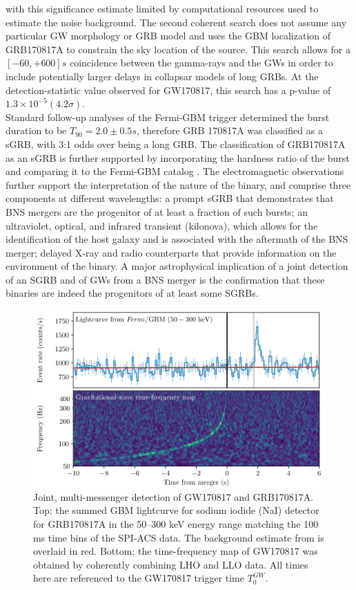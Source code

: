 \documentclass[binding=0.6cm, LaM]{sapthesis}
\begin{document}
	with this significance estimate limited by computational resources used to estimate the noise background. 
	The second coherent search does not assume any particular GW morphology or GRB model 
	\cite{55,144,145} and uses the GBM localization of GRB170817A 	
	to constrain the sky location of the source. This search allows for a $[-60, +600] s$ 
	coincidence between the gamma-rays and the GWs in order to include potentially 
	larger delays in collapsar models of long GRBs. 
	At the detection-statistic value observed for GW170817, this search has a p-value of $1.3\times 10^{-5} (4.2\sigma)$. \\ 
	Standard follow-up analyses \cite{108,110} of the Fermi-GBM trigger 
	determined the burst duration to be $T_{90} = 2.0 \pm 0.5 s$,
	therefore GRB 170817A was classified as a sGRB, with 3:1 odds over being a long GRB. 
	The classification of GRB170817A as an sGRB is further supported by incorporating 
	the hardness ratio of the burst and comparing it to the Fermi-GBM catalog \cite{110}. 
	The electromagnetic observations further support the interpretation of the nature of the binary, 
	and comprise three components at different wavelengths: a prompt sGRB that demonstrates 
	that BNS mergers are the progenitor of at least a fraction of such bursts; an ultraviolet, optical, 
	and infrared transient (kilonova), which allows for the identification of the host galaxy 
	and is associated with the aftermath of the BNS merger; 
	delayed X-ray and radio counterparts that provide information on the environment of the binary. 
	A major astrophysical implication of a joint detection of an SGRB and of GWs from a BNS merger 
	is the confirmation that these binaries are indeed the progenitors of at least some SGRBs. 
		\begin{figure}[H]
                        \label{gw-grb}
                        \includegraphics[scale=0.45]{gw-grb}
                        \centering
                        \caption{Joint, multi-messenger detection of GW170817 and GRB170817A. Top: the summed GBM lightcurve for sodium iodide (NaI) detector for GRB170817A in the 50–300 keV energy range matching the 100 ms time bins of the SPI-ACS data. The background estimate from \cite{110} is overlaid in red. Bottom: the time-frequency map of GW170817 was obtained by coherently combining LHO and LLO data. All times here are referenced to the GW170817 trigger time $T_0^{GW}$. \cite{55}}
                        \label{fig:gw-grb}
                \end{figure}
\end{document}
